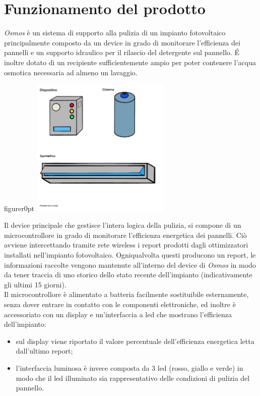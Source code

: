 \documentclass[a4paper, 12pt]{article}
\begin{document}
	\section{Funzionamento del prodotto}
	\emph{Osmos} è un sistema di supporto alla pulizia di un impianto fotovoltaico principalmente composto da un device in grado di monitorare l'efficienza dei pannelli 
	e un supporto idraulico per il rilascio del detergente sul pannello. \'E inoltre dotato di un recipiente sufficientemente ampio per poter contenere l'acqua osmotica necessaria ad almeno un lavaggio.\\
	\begin{wrapfloat}{figure}{r}{0pt}
		\includegraphics[width=0.5\textwidth]{Images/PROTOTIPO2.PNG}
	\end{wrapfloat}
	Il device principale che gestisce l'intera logica della pulizia, si compone di un microcontrollore in grado di monitorare l'efficienza energetica dei pannelli. Ciò avviene intercettando tramite rete wireless i report prodotti dagli ottimizzatori installati nell'impianto fotovoltaico. Ogniqualvolta questi producono un report, le informazioni raccolte vengono mantenute all'interno del device di \emph{Osmos} in modo da tener traccia di uno storico dello stato recente dell'impianto (indicativamente gli ultimi 15 giorni).\\
	Il microcontrollore è alimentato a batteria facilmente sostituibile esternamente, senza dover entrare in contatto con le componenti elettroniche, ed inoltre è accessoriato con un display e un'interfaccia a led che mostrano l'efficienza dell'impianto:
	\begin{itemize}
		\item sul display viene riportato il valore percentuale dell'efficienza energetica letta dall'ultimo report;
		\item l'interfaccia luminosa è invece composta da 3 led (rosso, giallo e verde) in modo che il led illuminato sia rappresentativo delle condizioni di pulizia del pannello.
	\end{itemize}
\end{document}
